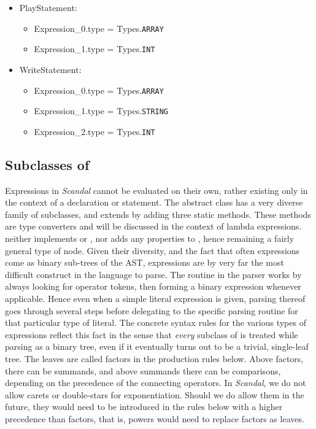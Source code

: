 \begin{itemize}
\begin{itemize}
		\end{itemize}
	\item PlayStatement:
		\begin{itemize}
			\item Expression\_0.type = Types.\texttt{ARRAY}
			\item Expression\_1.type = Types.\texttt{INT}
		\end{itemize}
	\item WriteStatement:
		\begin{itemize}
			\item Expression\_0.type = Types.\texttt{ARRAY}
			\item Expression\_1.type = Types.\texttt{STRING}
			\item Expression\_2.type = Types.\texttt{INT}
		\end{itemize}
\end{itemize}

\subsection{Subclasses of }

Expressions in \emph{Scandal} cannot be evaluated on their own, rather existing only in the context of a declaration or statement. The abstract class  has a very diverse family of subclasses, and extends  by adding three static methods. These methods are type converters and will be discussed in the context of lambda expressions.  neither implements  or , nor adds any properties to , hence remaining a fairly general type of node. Given their diversity, and the fact that often expressions come as binary sub-trees of the AST, expressions are by very far the most difficult construct in the language to parse. The  routine in the parser works by always looking for operator tokens, then forming a binary expression whenever applicable. Hence even when a simple literal expression is given, parsing thereof goes through several steps before delegating to the specific parsing routine for that particular type of literal. The concrete syntax rules for the various types of expressions reflect this fact in the sense that \emph{every} subclass of  is treated while parsing as a binary tree, even if it eventually turns out to be a trivial, single-leaf tree. The leaves are called factors in the production rules below. Above factors, there can be summands, and above summands there can be comparisons, depending on the precedence of the connecting operators. In \emph{Scandal}, we do not allow carets or double-stars for exponentiation. Should we do allow them in the future, they would need to be introduced in the rules below with a higher precedence than factors, that is, powers would need to replace factors as leaves.

